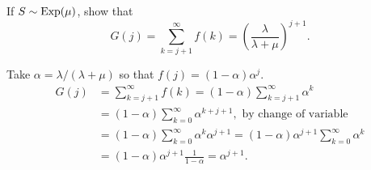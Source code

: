 \begin{exercise} [\faFlask]
 If $S\sim \operatorname{Exp}(\mu)$, show that 
  \begin{equation}
G(j) = \sum_{k=j+1}^\infty f(k) =  \left(\frac{\lambda}{\lambda+\mu}\right)^{j+1}.
  \end{equation}
\begin{solution}
  Take $\alpha = \lambda/(\lambda+\mu)$ so that
  $f(j) = (1-\alpha) \alpha^j$.
\begin{align*}
  G(j) 
&= \sum_{k=j+1}^\infty f(k)  = (1-\alpha) \sum_{k=j+1}^\infty \alpha^k \\
& = (1-\alpha) \sum_{k=0}^\infty \alpha^{k+j+1}, \text{ by change of variable}\\
& = (1-\alpha) \sum_{k=0}^\infty \alpha^{k}\alpha^{j+1}= (1-\alpha)\alpha^{j+1} \sum_{k=0}^\infty \alpha^k \\
&= (1-\alpha)\alpha^{j+1} \frac{1}{1-\alpha} = \alpha^{j+1}.
\end{align*}
    \end{solution}
\end{exercise}

